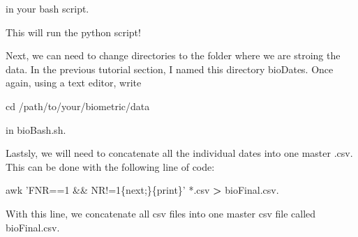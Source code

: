 \documentclass[]{book}
\newenvironment{Shaded}{\begin{snugshade}}{\end{snugshade}}
\newcommand{\StringTok}[1]{\textcolor[rgb]{0.31,0.60,0.02}{#1}}
\newcommand{\FunctionTok}[1]{\textcolor[rgb]{0.00,0.00,0.00}{#1}}
\newcommand{\OperatorTok}[1]{\textcolor[rgb]{0.81,0.36,0.00}{\textbf{#1}}}
\newcommand{\BuiltInTok}[1]{#1}
\newcommand{\NormalTok}[1]{#1}
\begin{document}
in your bash script.

This will run the python script!

Next, we can need to change directories to the folder where we are
stroing the data. In the previous tutorial section, I named this
directory bioDates. Once again, using a text editor, write

\begin{Shaded}
\begin{Highlighting}[]
\BuiltInTok{cd}\NormalTok{ /path/to/your/biometric/data }
\end{Highlighting}
\end{Shaded}

in bioBash.sh.

Lastsly, we will need to concatenate all the individual dates into one
master .csv. This can be done with the following line of code:

\begin{Shaded}
\begin{Highlighting}[]
\FunctionTok{awk} \StringTok{'FNR==1 && NR!=1\{next;\}\{print\}'}\NormalTok{ *.csv }\OperatorTok{>}\NormalTok{ bioFinal.csv.}
\end{Highlighting}
\end{Shaded}

With this line, we concatenate all csv files into one master csv file
called bioFinal.csv.


\end{document}
